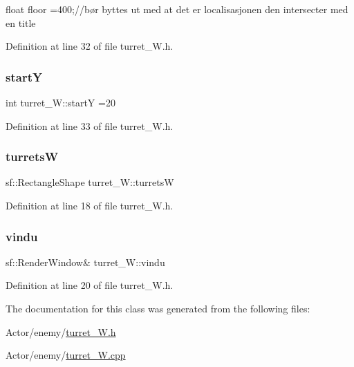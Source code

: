 float floor =400;//bør byttes ut med at det er localisasjonen den intersecter med en title 



Definition at line 32 of file turret\+\_\+\+W.\+h.

\hypertarget{classturret___w_adb9f5689156e17451806b3b3390a7d20}{}\label{classturret___w_adb9f5689156e17451806b3b3390a7d20} 
\subsubsection{\texorpdfstring{startY}{startY}}
{\footnotesize\ttfamily int turret\+\_\+\+W\+::startY =20}



Definition at line 33 of file turret\+\_\+\+W.\+h.

\hypertarget{classturret___w_a2537f62195a8cb57eac8d0c7b93062d3}{}\label{classturret___w_a2537f62195a8cb57eac8d0c7b93062d3} 
\subsubsection{\texorpdfstring{turretsW}{turretsW}}
{\footnotesize\ttfamily sf\+::\+Rectangle\+Shape turret\+\_\+\+W\+::turretsW}



Definition at line 18 of file turret\+\_\+\+W.\+h.

\hypertarget{classturret___w_a5f2bc12dc323bcdb13db6df48a64e61f}{}\label{classturret___w_a5f2bc12dc323bcdb13db6df48a64e61f} 
\subsubsection{\texorpdfstring{vindu}{vindu}}
{\footnotesize\ttfamily sf\+::\+Render\+Window\& turret\+\_\+\+W\+::vindu}



Definition at line 20 of file turret\+\_\+\+W.\+h.



The documentation for this class was generated from the following files\+:\begin{DoxyCompactItemize}
\item 
Actor/enemy/\hyperlink{turret___w_8h}{turret\+\_\+\+W.\+h}\item 
Actor/enemy/\hyperlink{turret___w_8cpp}{turret\+\_\+\+W.\+cpp}\end{DoxyCompactItemize}
